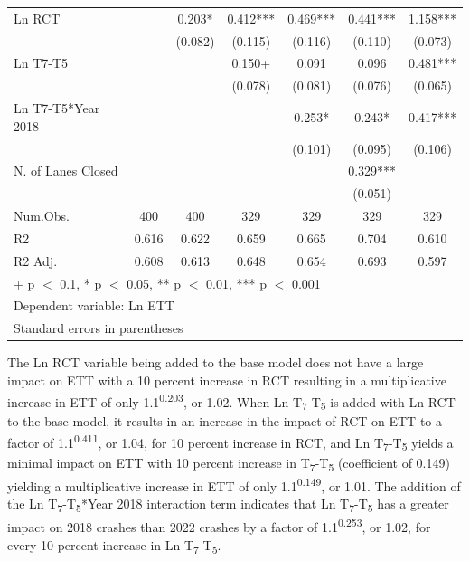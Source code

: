 \documentclass[
  letterpaper,
  authoryear]{elsarticle}
\begin{document}
\begin{table}
{\begin{tabular}[t]{lcccccc}
Ln RCT &  & 0.203* & 0.412*** & 0.469*** & 0.441*** & 1.158***\\
 &  & (0.082) & (0.115) & (0.116) & (0.110) & (0.073)\\
Ln T7-T5 &  &  & 0.150+ & 0.091 & 0.096 & 0.481***\\
 &  &  & (0.078) & (0.081) & (0.076) & (0.065)\\
Ln T7-T5*Year 2018 &  &  &  & 0.253* & 0.243* & 0.417***\\
 &  &  &  & (0.101) & (0.095) & (0.106)\\
N. of Lanes Closed &  &  &  &  & 0.329*** & \\
 &  &  &  &  & (0.051) & \\
\midrule
Num.Obs. & 400 & 400 & 329 & 329 & 329 & 329\\
R2 & 0.616 & 0.622 & 0.659 & 0.665 & 0.704 & 0.610\\
R2 Adj. & 0.608 & 0.613 & 0.648 & 0.654 & 0.693 & 0.597\\
\bottomrule
\multicolumn{7}{l}{\rule{0pt}{1em}+ p $<$ 0.1, * p $<$ 0.05, ** p $<$ 0.01, *** p $<$ 0.001}\\
\multicolumn{7}{l}{\rule{0pt}{1em}Dependent variable: Ln ETT}\\
\multicolumn{7}{l}{\rule{0pt}{1em}Standard errors in parentheses}\\
\end{tabular}

}

\end{table}%

The Ln RCT variable being added to the base model does not have a large
impact on ETT with a 10 percent increase in RCT resulting in a
multiplicative increase in ETT of only 1.1\textsuperscript{0.203}, or
1.02. When Ln T\textsubscript{7}-T\textsubscript{5} is added with Ln RCT
to the base model, it results in an increase in the impact of RCT on ETT
to a factor of 1.1\textsuperscript{0.411}, or 1.04, for 10 percent
increase in RCT, and Ln T\textsubscript{7}-T\textsubscript{5} yields a
minimal impact on ETT with 10 percent increase in
T\textsubscript{7}-T\textsubscript{5} (coefficient of 0.149) yielding a
multiplicative increase in ETT of only 1.1\textsuperscript{0.149}, or
1.01. The addition of the Ln T\textsubscript{7}-T\textsubscript{5}*Year
2018 interaction term indicates that Ln
T\textsubscript{7}-T\textsubscript{5} has a greater impact on 2018
crashes than 2022 crashes by a factor of 1.1\textsuperscript{0.253}, or
1.02, for every 10 percent increase in Ln
T\textsubscript{7}-T\textsubscript{5}.
\end{document}
